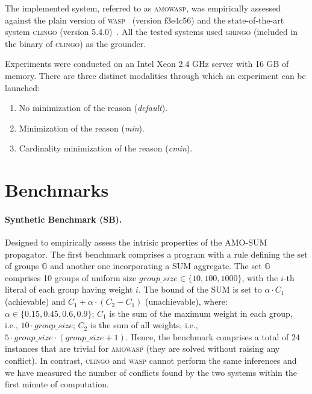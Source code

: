 The implemented system, referred to as \textsc{amowasp}, was empirically assessed against the plain version 
of \textsc{wasp}~\cite{DBLP:conf/lpnmr/AlvianoDLR15} (version f3e4c56) and the state-of-the-art system \textsc{clingo} (version 5.4.0)~\cite{DBLP:conf/iclp/GebserKKOSW16}.
All the tested systems used \textsc{gringo} (included in the binary of \textsc{clingo}) as the grounder.

Experiments were conducted on an Intel Xeon 2.4 GHz server with 16 GB of memory.
There are three distinct modalities through which an experiment can be launched:
\begin{enumerate}
    \item No minimization of the reason (\textit{default}).
    \item Minimization of the reason (\textit{min}).
    \item Cardinality minimization of the reason (\textit{cmin}).
\end{enumerate}



\section{Benchmarks}

\paragraph{Synthetic Benchmark (SB).}%
Designed to empirically assess the intrisic properties of the AMO-SUM propagator.
The first benchmark comprises a program with a rule defining the set of groups $\mathbb{G}$ and another one incorporating a SUM aggregate.
The set $\mathbb{G}$ comprises 10 groups of uniform size $\mathit{group\_size} \in \{10, 100, 1000\}$, 
with the $i$-th literal of each group having weight $i$.
The bound of the SUM is set to
$\alpha \cdot C_1$ (achievable)
and
$C_1 + \alpha \cdot (C_2 - C_1)$ (unachievable), where:
$\alpha \in \{0.15, 0.45, 0.6, 0.9\}$;
$C_1$ is the sum of the maximum weight in each group, i.e., $10 \cdot \mathit{group\_size}$;
$C_2$ is the sum of all weights, i.e., $5 \cdot \mathit{group\_size} \cdot (\mathit{group\_size} + 1)$.
Hence, the benchmark comprises a total of 24 instances that are trivial for \textsc{amowasp} 
(they are solved without raising any conflict).
In contrast, \textsc{clingo} and \textsc{wasp} cannot perform the same inferences
and we have measured the number of conflicts found by the two systems within 
the first minute of computation.

